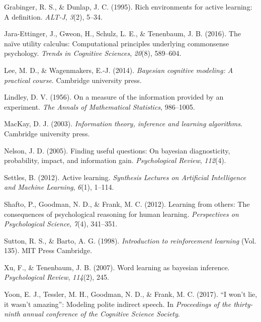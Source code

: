 \documentclass[10pt, letterpaper]{article}
\begin{document}
\hypertarget{ref-grabinger1995rich}{}
Grabinger, R. S., \& Dunlap, J. C. (1995). Rich environments for active
learning: A definition. \emph{ALT-J}, \emph{3}(2), 5--34.

\hypertarget{ref-jara2016}{}
Jara-Ettinger, J., Gweon, H., Schulz, L. E., \& Tenenbaum, J. B. (2016).
The naïve utility calculus: Computational principles underlying
commonsense psychology. \emph{Trends in Cognitive Sciences},
\emph{20}(8), 589--604.

\hypertarget{ref-lee2014bayesian}{}
Lee, M. D., \& Wagenmakers, E.-J. (2014). \emph{Bayesian cognitive
modeling: A practical course}. Cambridge university press.

\hypertarget{ref-lindley1956}{}
Lindley, D. V. (1956). On a measure of the information provided by an
experiment. \emph{The Annals of Mathematical Statistics}, 986--1005.

\hypertarget{ref-mackay2003}{}
MacKay, D. J. (2003). \emph{Information theory, inference and learning
algorithms}. Cambridge university press.

\hypertarget{ref-nelson2005}{}
Nelson, J. D. (2005). Finding useful questions: On bayesian
diagnosticity, probability, impact, and information gain.
\emph{Psychological Review}, \emph{112}(4).

\hypertarget{ref-settles2012active}{}
Settles, B. (2012). Active learning. \emph{Synthesis Lectures on
Artificial Intelligence and Machine Learning}, \emph{6}(1), 1--114.

\hypertarget{ref-shafto2012learning}{}
Shafto, P., Goodman, N. D., \& Frank, M. C. (2012). Learning from
others: The consequences of psychological reasoning for human learning.
\emph{Perspectives on Psychological Science}, \emph{7}(4), 341--351.

\hypertarget{ref-sutton1998}{}
Sutton, R. S., \& Barto, A. G. (1998). \emph{Introduction to
reinforcement learning} (Vol. 135). MIT Press Cambridge.

\hypertarget{ref-xu2007}{}
Xu, F., \& Tenenbaum, J. B. (2007). Word learning as bayesian inference.
\emph{Psychological Review}, \emph{114}(2), 245.

\hypertarget{ref-yoon2017}{}
Yoon, E. J., Tessler, M. H., Goodman, N. D., \& Frank, M. C. (2017). ``I
won't lie, it wasn't amazing'': Modeling polite indirect speech. In
\emph{Proceedings of the thirty-ninth annual conference of the Cognitive
Science Society}.
\end{document}

